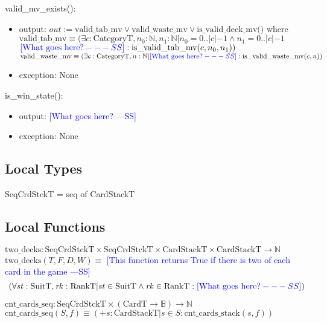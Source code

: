 \documentclass[12pt]{article}
\newcommand{\authornote}[3]{\textcolor{#1}{[#3 ---#2]}}
\newcommand{\authornote}[3]{}
\newcommand{\wss}[1]{\authornote{blue}{SS}{#1}}
\begin{document}
\noindent valid\_mv\_exists():
\begin{itemize}
\item output: $out := \text{valid\_tab\_mv} \vee \text{valid\_waste\_mv} \vee
  \text{is\_valid\_deck\_mv()}$ where\\

  $\text{valid\_tab\_mv} \equiv (\exists c: \text{CategoryT}, n_0: \mathbb{N},
  n_1: \mathbb{N} | n_0 = 0..|c|-1 \land n_1 = 0..|c|-1 $\\$ \wss{\text{What goes here?}}: \text{is\_valid\_tab\_mv}(c, n_0, n_1))$\\

  $\text{valid\_waste\_mv} \equiv (\exists c: \text{CategoryT}, n: \mathbb{N} |
  \wss{\text{What goes here?}} : \text{is\_valid\_waste\_mv}(c, n))$

\item exception: None

\end{itemize}

\noindent is\_win\_state():
\begin{itemize}
\item output: \wss{What goes here?}
\item exception: None

\end{itemize}

\subsection*{Local Types}

SeqCrdStckT = seq of CardStackT

\subsection*{Local Functions}

\noindent $\text{two\_decks} : \text{SeqCrdStckT} \times \text{SeqCrdStckT}
\times \text{CardStackT} \times \text{CardStackT} \rightarrow \mathbb{N}$\\
\noindent
$\text{two\_decks}(T, F, D, W) \equiv$ \wss{This function returns True if there
  is two of each card in the game}
$$(\forall \mathit{st}: \text{SuitT}, \mathit{rk}:
\text{RankT} | \mathit{st} \in \text{SuitT} \wedge \mathit{rk} \in \text{RankT}
: \wss{\text{What goes here?}})$$

\noindent $\text{cnt\_cards\_seq}: \text{SeqCrdStckT} \times (\text{CardT}
\rightarrow \mathbb{B}) \rightarrow \mathbb{N}$\\
\noindent $\text{cnt\_cards\_seq}(S, f) \equiv (+ s: \text{CardStackT} | s \in S :
\text{cnt\_cards\_stack}(s, f))$\\
\end{document}
